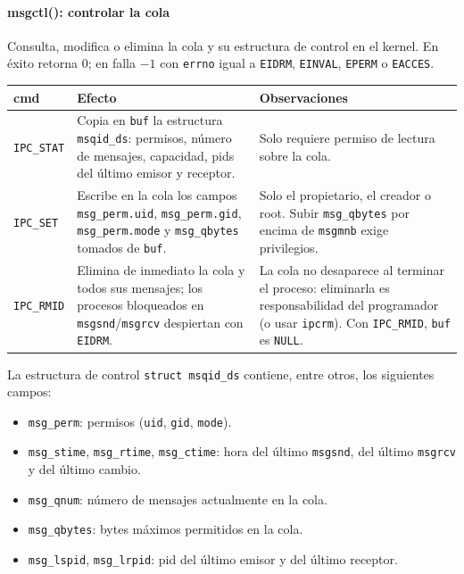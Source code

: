 \documentclass[12pt,a4paper]{article}
\begin{document}
\paragraph{msgctl(): controlar la cola}
Consulta, modifica o elimina la cola y su estructura de control en el kernel. En éxito retorna $0$; en falla $-1$ con \texttt{errno} igual a \texttt{EIDRM}, \texttt{EINVAL}, \texttt{EPERM} o \texttt{EACCES}.

\begin{table}[h]
\centering
\small
\begin{tabular}{|l|p{5.6cm}|p{5.2cm}|}
\hline
\textbf{cmd} & \textbf{Efecto} & \textbf{Observaciones} \\ \hline
\texttt{IPC\_STAT} & Copia en \texttt{buf} la estructura \texttt{msqid\_ds}: permisos, número de mensajes, capacidad, pids del último emisor y receptor. & Solo requiere permiso de lectura sobre la cola. \\ \hline
\texttt{IPC\_SET} & Escribe en la cola los campos \texttt{msg\_perm.uid}, \texttt{msg\_perm.gid}, \texttt{msg\_perm.mode} y \texttt{msg\_qbytes} tomados de \texttt{buf}. & Solo el propietario, el creador o root. Subir \texttt{msg\_qbytes} por encima de \texttt{msgmnb} exige privilegios. \\ \hline
\texttt{IPC\_RMID} & Elimina de inmediato la cola y todos sus mensajes; los procesos bloqueados en \texttt{msgsnd}/\texttt{msgrcv} despiertan con \texttt{EIDRM}. & La cola no desaparece al terminar el proceso: eliminarla es responsabilidad del programador (o usar \texttt{ipcrm}). Con \texttt{IPC\_RMID}, \texttt{buf} es \texttt{NULL}. \\ \hline
\end{tabular}
\end{table}

La estructura de control \texttt{struct msqid\_ds} contiene, entre otros, los siguientes campos:
\begin{itemize}
    \item \texttt{msg\_perm}: permisos (\texttt{uid}, \texttt{gid}, \texttt{mode}).
    \item \texttt{msg\_stime}, \texttt{msg\_rtime}, \texttt{msg\_ctime}: hora del último \texttt{msgsnd}, del último \texttt{msgrcv} y del último cambio.
    \item \texttt{msg\_qnum}: número de mensajes actualmente en la cola.
    \item \texttt{msg\_qbytes}: bytes máximos permitidos en la cola.
    \item \texttt{msg\_lspid}, \texttt{msg\_lrpid}: pid del último emisor y del último receptor.
\end{itemize}
\end{document}

